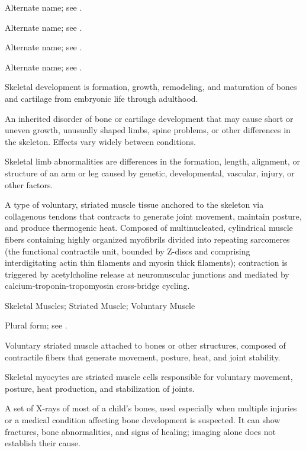  Alternate name; see .

 Alternate name; see .

 Alternate name; see .

 Alternate name; see .

 Skeletal development is formation, growth, remodeling, and maturation of bones and cartilage from embryonic life through adulthood.

 An inherited disorder of bone or cartilage development that may cause short or uneven growth, unusually shaped limbs, spine problems, or other differences in the skeleton. Effects vary widely between conditions.

 Skeletal limb abnormalities are differences in the formation, length, alignment, or structure of an arm or leg caused by genetic, developmental, vascular, injury, or other factors.

 A type of voluntary, striated muscle tissue anchored to the skeleton via collagenous tendons that contracts to generate joint movement, maintain posture, and produce thermogenic heat. Composed of multinucleated, cylindrical muscle fibers containing highly organized myofibrils divided into repeating sarcomeres (the functional contractile unit, bounded by Z-discs and comprising interdigitating actin thin filaments and myosin thick filaments); contraction is triggered by acetylcholine release at neuromuscular junctions and mediated by calcium-troponin-tropomyosin cross-bridge cycling.

\synonyms
Skeletal Muscles; Striated Muscle; Voluntary Muscle

 Plural form; see .

 Voluntary striated muscle attached to bones or other structures, composed of contractile fibers that generate movement, posture, heat, and joint stability.

 Skeletal myocytes are striated muscle cells responsible for voluntary movement, posture, heat production, and stabilization of joints.

 A set of X-rays of most of a child's bones, used especially when multiple injuries or a medical condition affecting bone development is suspected. It can show fractures, bone abnormalities, and signs of healing; imaging alone does not establish their cause.

